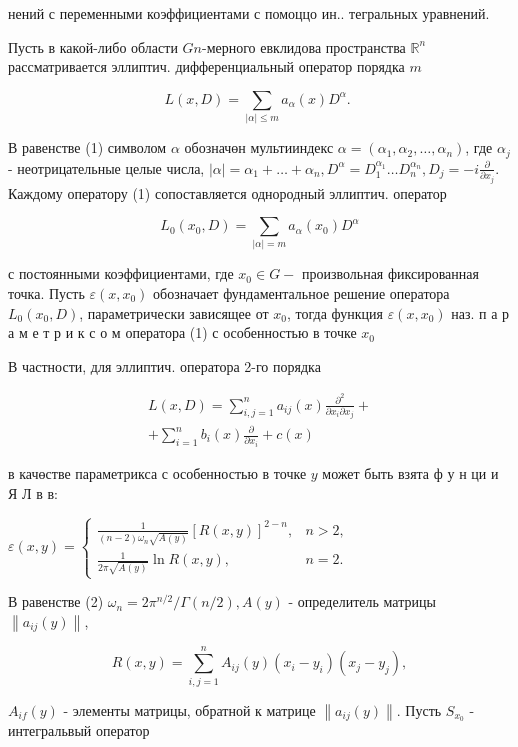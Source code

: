 \documentclass[10pt]{article}
\begin{document}
нений с переменными коэффициентами с помоццо ин.. тегральных уравнений.

Пусть в какой-либо области $G n$-мерного евклидова пространства $\mathbb{R}^{n}$ рассматривается эллиптич. дифференциальный оператор порядка $m$

\[
L(x, D)=\sum_{|\alpha| \leqslant m} a_{\alpha}(x) D^{\alpha} \text {. }
\]

В равенстве (1) символом $\alpha$ обозначөн мультииндекс $\alpha=\left(\alpha_{1}, \alpha_{2}, \ldots, \alpha_{n}\right)$, где $\alpha_{j}$ - неотрицательные целые числа, $|\alpha|=\alpha_{1}+\ldots+\alpha_{n}, D^{\alpha}=D_{1}^{\alpha_{1}} \ldots D_{n}^{\alpha_{n}}, D_{j}=-i \frac{\partial}{\partial x_{j}}$. Каждому оператору (1) сопоставляется однородный эллиптич. оператор

\[
L_{0}\left(x_{0}, D\right)=\sum_{|\alpha|=m} a_{\alpha}\left(x_{0}\right) D^{\alpha}
\]

с постоянными коэффициентами, где $x_{0} \in G-$ произвольная фиксированная точка. Пусть $\varepsilon\left(x, x_{0}\right)$ обозначает фундаментальное решение оператора $L_{0}\left(x_{0}, D\right)$, параметрически зависящее от $x_{0}$, тогда функция $\varepsilon\left(x, x_{0}\right)$ наз. п а р а м е т р и к с о м оператора (1) с особенностью в точке $x_{0}$

В частности, для эллиптич. оператора 2-го порядка

\[
\begin{gathered}
L(x, D)=\sum_{i, j=1}^{n} a_{i j}(x) \frac{\partial^{2}}{\partial x_{i} \partial x_{j}}+ \\
+\sum_{i=1}^{n} b_{i}(x) \frac{\partial}{\partial x_{i}}+c(x)
\end{gathered}
\]

в качөстве параметрикса с особенностью в точке $y$ может быть взята ф у н ци и Я Л в в:

$\varepsilon(x, y)= \begin{cases}\frac{1}{(n-2) \omega_{n} \sqrt{A(y)}}[R(x, y)]^{2-n}, & n>2, \\ \frac{1}{2 \pi \sqrt{A(y)}} \ln R(x, y), & n=2 .\end{cases}$

В равенстве (2) $\omega_{n}=2 \pi^{n / 2} / \Gamma(n / 2), A(y)$ - определитель матрицы $\left\|a_{i j}(y)\right\|$,

\[
R(x, y)=\sum_{i, j=1}^{n} A_{i j}(y)\left(x_{i}-y_{i}\right)\left(x_{j}-y_{j}\right),
\]

$A_{i f}(y)$ - элементы матрицы, обратной к матрице $\left\|a_{i j}(y)\right\|$. Пусть $S_{x_{0}}$ - интегральвый оператор
\end{document}
